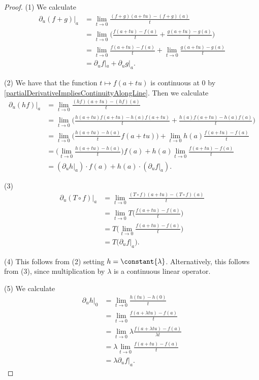 \begin{proof}
(1) We calculate
\begin{align*}
\partial_u(f+g)|_a &= \lim_{t\to 0} \frac{(f+g)(a+tu) - (f+g)(a)}{t} \\
&= \lim_{t\to 0} \Big(\frac{f(a+tu) - f(a)}{t} + \frac{g(a+tu) - g(a)}{t} \Big) \\
&= \lim_{t\to 0}\frac{f(a+tu) - f(a)}{t} + \lim_{t\to 0} \frac{g(a+tu) - g(a)}{t} \\
&= \partial_uf|_a + \partial_u g|_a.
\end{align*}

(2) We have that the function $t\mapsto f(a+tu)$ is continuous at $0$ by \ref{partialDerivativeImpliesContinuityAlongLine}. Then we calculate
\begin{align*}
\partial_u(hf)|_a &= \lim_{t\to 0} \frac{(hf)(a+tu) - (hf)(a)}{t} \\
&= \lim_{t\to 0} \Big(\frac{h(a+tu)f(a+tu) - h(a)f(a+tu)}{t} + \frac{h(a)f(a+tu) - h(a)f(a)}{t}\Big) \\
&= \lim_{t\to 0} \Big(\frac{h(a+tu) - h(a)}{t}f(a+tu)\Big) + \lim_{t\to 0}h(a)\frac{f(a+tu) - f(a)}{t} \\
&= \Big(\lim_{t\to 0} \frac{h(a+tu) - h(a)}{t}\Big)f(a) + h(a)\lim_{t\to 0}\frac{f(a+tu) - f(a)}{t} \\
&= (\partial_uh|_a)\cdot f(a) + h(a)\cdot(\partial_u f|_a).
\end{align*}

(3) \begin{align*}
\partial_u(T\circ f)|_a &= \lim_{t\to 0} \frac{(T\circ f)(a+tu) - (T\circ f)(a)}{t} \\
&= \lim_{t\to 0} T\Big(\frac{f(a+tu)-f(a)}{t}\Big) \\
&= T\Big(\lim_{t\to 0} \frac{f(a+tu)-f(a)}{t}\Big) \\
&= T\big(\partial_uf|_a\big).
\end{align*}

(4) This follows from (2) setting $h = \constant{\lambda}$. Alternatively, this follows from (3), since multiplication by $\lambda$ is a continuous linear operator.

(5) We calculate
\begin{align*}
\partial_uh|_0 &= \lim_{t\to 0} \frac{h(tu) - h(0)}{t} \\
&= \lim_{t\to 0} \frac{f(a+ \lambda tu) - f(a)}{t} \\
&= \lim_{t\to 0} \lambda\frac{f(a+ \lambda tu) - f(a)}{\lambda t} \\
&= \lambda\lim_{t\to 0} \frac{f(a+ tu) - f(a)}{t} \\
&= \lambda\partial_uf|_a.
\end{align*}
\end{proof}

